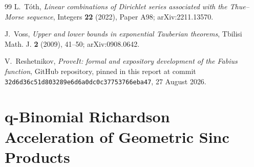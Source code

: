 \documentclass[11pt,oneside]{article}
\numberwithin{equation}{section}
\theoremstyle{definition}
\theoremstyle{remark}
\begin{document}
\begin{thebibliography}{99}
L.~T\'oth,
\emph{Linear combinations of Dirichlet series associated with the Thue--Morse sequence},
Integers \textbf{22} (2022), Paper A98; arXiv:2211.13570.

J.~Voss,
\emph{Upper and lower bounds in exponential Tauberian theorems},
Tbilisi Math. J. \textbf{2} (2009), 41--50; arXiv:0908.0642.

V.~Reshetnikov,
\emph{ProveIt: formal and expository development of the Fabius function},
GitHub repository, pinned in this report at commit
\texttt{32d6d36c51d803289e6d6a0dc0c37753766eba47}, 27 August 2026.

\end{thebibliography}


\newcommand{\up}{\operatorname{up}}
\newcommand{\ePartx}{\mathrm{e}}
\newcommand{\iiPartx}{\mathrm{i}}
\newcommand{\RPartx}{\mathbb{R}}
\newcommand{\CPartx}{\mathbb{C}}
\newcommand{\NPartx}{\mathbb{N}}
\newcommand{\D}{\mathrm{D}}
\newcommand{\norm}[1]{\left\lVert #1\right\rVert}
\newcommand{\abs}[1]{\left\lvert #1\right\rvert}
\newcommand{\qbinomPartx}[2]{\genfrac{[}{]}{0pt}{}{#1}{#2}_{q}}

\setcounter{section}{0}
\renewcommand{\thesection}{\arabic{section}}
\part{q-Binomial Richardson Acceleration of Geometric Sinc Products}
\end{document}
